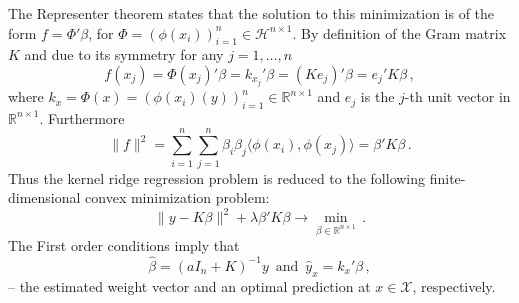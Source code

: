 \documentclass{ITaSconf}
\newcommand{\Hcal}{\mathcal{H}}
\newcommand{\Xcal}{\mathcal{X}}
\newcommand{\Real}{\mathbb{R}}
\begin{document}
The Representer theorem states that the solution to this minimization is of the form
$f = \Phi'\beta$, for $\Phi = (\phi(x_i))_{i=1}^n \in \Hcal^{n\times 1}$. By definition
of the Gram matrix $K$ and due to its symmetry for any $j=1,\ldots,n$
\begin{equation*}
  f(x_j)
    = \Phi(x_j)' \beta
    = k_{x_j}' \beta
    = (K e_j)' \beta
    = e_j' K \beta
    \,,
\end{equation*}
where $k_x = \Phi(x) = (\phi(x_i)(y))_{i=1}^n \in \Real^{n\times 1}$ and $e_j$ is
the $j$-th unit vector in $\Real^{n\times 1}$. Furthermore
\begin{equation*}
  \| f \|^2
    = \sum_{i=1}^n\sum_{j=1}^n\beta_i\beta_j \langle\phi(x_i), \phi(x_j)\rangle
    = \beta' K \beta \,.
\end{equation*}
Thus the kernel ridge regression problem is reduced to the following finite-dimensional
convex minimization problem:
\begin{equation*}
  \|y - K \beta \|^2 + \lambda \beta' K \beta
    \to \min_{\beta\in \Real^{n\times 1}} \,.
\end{equation*}
The First order conditions imply that
\begin{equation*}
  \hat{\beta} = (aI_n + K)^{-1} y \,\text{ and }\, \hat{y}_x = k_x' \beta \,,
\end{equation*}
-- the estimated weight vector and an optimal prediction at $x\in \Xcal$, respectively.
\end{document}
